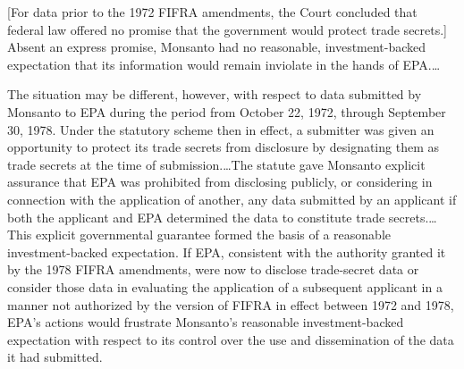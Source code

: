
[For data prior to the 1972 FIFRA amendments, the Court concluded that federal
law offered no promise that the government would protect trade secrets.]
Absent an express promise, Monsanto had no reasonable,
investment-backed expectation that its information would remain inviolate in the
hands of EPA.\ldots



The situation may be different, however, with respect to data submitted by
Monsanto to EPA during the period from October 22, 1972, through September 30,
1978. Under the statutory scheme then in effect, a submitter was given an
opportunity to protect its trade secrets from disclosure by designating them as
trade secrets at the time of submission.\ldots The statute gave Monsanto
explicit assurance that EPA was prohibited from disclosing publicly, or
considering in connection with the application of another, any data submitted by
an applicant if both the applicant and EPA determined the data to constitute
trade secrets.\ldots This
explicit governmental guarantee formed the basis of a reasonable
investment-backed expectation. If EPA, consistent with the authority granted it
by the 1978 FIFRA amendments, were now to disclose trade-secret data or consider
those data in evaluating the application of a subsequent applicant in a manner
not authorized by the version of FIFRA in effect between 1972 and 1978, EPA's
actions would frustrate Monsanto's reasonable investment-backed expectation with
respect to its control over the use and dissemination of the data it had
submitted.

